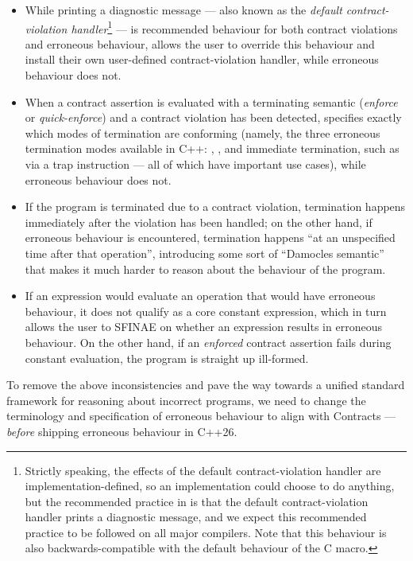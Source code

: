 \begin{itemize}
\item While printing a diagnostic message --- also known as the \emph{default contract-violation handler}\footnote{Strictly speaking, the effects of the default contract-violation handler are implementation-defined, so an implementation could choose to do anything, but the recommended practice in \cite{P2900R13} is that the default contract-violation handler prints a diagnostic message, and we expect this recommended practice to be followed on all major compilers. Note that this behaviour is also backwards-compatible with the default behaviour of the C  macro.} --- is recommended behaviour for both contract violations and erroneous behaviour, \cite{P2900R13} allows the user to override this behaviour and install their own user-defined contract-violation handler, while erroneous behaviour does not. 

\item When a contract assertion is evaluated with a terminating semantic (\emph{enforce} or \emph{quick-enforce}) and a contract violation has been detected, \cite{P2900R13} specifies exactly which modes of termination are conforming (namely, the three erroneous termination modes available in C++: , , and immediate termination, such as via a trap instruction --- all of which have important use cases), while erroneous behaviour does not.

\item If the program is terminated due to a contract violation, termination happens immediately after the violation has been handled; on the other hand, if erroneous behaviour is encountered, termination happens ``at an unspecified time after that operation'', introducing some sort of ``Damocles semantic'' that makes it much harder to reason about the behaviour of the program.

\item If an expression would evaluate an operation that would have erroneous behaviour, it does not qualify as a core constant expression, which in turn allows the user to SFINAE on whether an expression results in erroneous behaviour. On the other hand, if an \emph{enforced} contract assertion fails during constant evaluation, the program is straight up ill-formed. 
\end{itemize}

To remove the above inconsistencies and pave the way towards a unified standard framework for reasoning about incorrect programs, we need to change the terminology and specification of erroneous behaviour to align with Contracts --- \emph{before} shipping erroneous behaviour in C++26.



